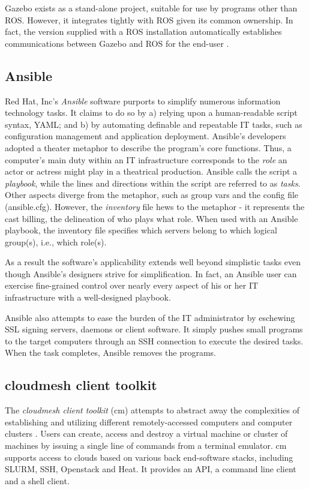 \documentclass[9pt,twocolumn,twoside]{../../styles/osajnl}
\begin{document}
Gazebo exists as a stand-alone project, suitable for use by programs other than ROS.  However, it integrates tightly with ROS given its common ownership.  In fact, the version supplied with a ROS installation automatically establishes communications between Gazebo and ROS for the end-user \cite{www-gazebo-ros}.  

\subsection{Ansible}

Red Hat, Inc's \cite{www-redhat} \textit{Ansible} software purports to simplify numerous information technology tasks.  It claims to do so by a) relying upon a human-readable script syntax, YAML; and b) by automating definable and repeatable IT tasks, such as configuration management and application deployment.  Ansible's developers adopted a theater metaphor to describe the program's core functions.  Thus, a computer's main duty within an IT infrastructure corresponds to the \textit{role} an actor or actress might play in a theatrical production.  Ansible calls the script a \textit{playbook}, while the lines and directions within the script are referred to as \textit{tasks}.  Other aspects diverge from the metaphor, such as group vars and the config file (ansible.cfg).  However, the \textit{inventory} file hews to the metaphor - it represents the cast billing, the delineation of who plays what role.  When used with an Ansible playbook, the inventory file specifies which servers belong to which logical group(s), i.e., which role(s). 

As a result the software's applicability extends well beyond simplistic tasks even though Ansible's designers strive for simplification.  In fact, an Ansible user can exercise fine-grained control over nearly every aspect of his or her IT infrastructure with a well-designed playbook.  

Ansible also attempts to ease the burden of the IT administrator by eschewing SSL signing servers, daemons or client software.  It simply pushes small programs to the target computers through an SSH connection to execute the desired tasks.  When the task completes, Ansible removes the programs. 

\subsection{cloudmesh client toolkit}
The \textit{cloudmesh client toolkit} (cm) attempts to abstract away the complexities of establishing and utilizing different remotely-accessed computers and computer clusters \cite{www-cm}.  Users can create, access and destroy a virtual machine or cluster of machines by issuing a single line of commands from a terminal emulator.  cm supports access to clouds based on various back end-software stacks, including SLURM, SSH, Openstack and Heat.  It provides an API, a command line client and a shell client.
\end{document}
